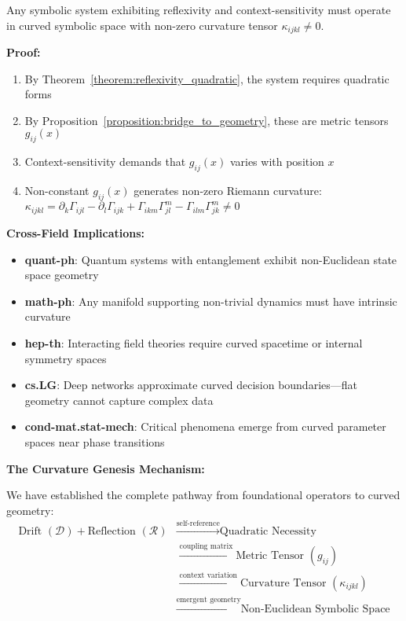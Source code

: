 \begin{corollary}
\label{corollary:non_euclidean_necessity}
Any symbolic system exhibiting reflexivity and context-sensitivity must operate in curved symbolic space with non-zero curvature tensor $\kappa_{ijkl} \neq 0$.

\textbf{Proof:} 
\begin{enumerate}
\item By Theorem~\ref{theorem:reflexivity_quadratic}, the system requires quadratic forms
\item By Proposition~\ref{proposition:bridge_to_geometry}, these are metric tensors $g_{ij}(x)$
\item Context-sensitivity demands that $g_{ij}(x)$ varies with position $x$
\item Non-constant $g_{ij}(x)$ generates non-zero Riemann curvature: $\kappa_{ijkl} = \partial_k \Gamma_{ijl} - \partial_l \Gamma_{ijk} + \Gamma_{ikm} \Gamma_{jl}^m - \Gamma_{ilm} \Gamma_{jk}^m \neq 0$
\end{enumerate}

\textbf{Cross-Field Implications:}
\begin{itemize}
\item \textbf{quant-ph}: Quantum systems with entanglement exhibit non-Euclidean state space geometry
\item \textbf{math-ph}: Any manifold supporting non-trivial dynamics must have intrinsic curvature
\item \textbf{hep-th}: Interacting field theories require curved spacetime or internal symmetry spaces
\item \textbf{cs.LG}: Deep networks approximate curved decision boundaries—flat geometry cannot capture complex data
\item \textbf{cond-mat.stat-mech}: Critical phenomena emerge from curved parameter spaces near phase transitions
\end{itemize}
\end{corollary}

\textbf{The Curvature Genesis Mechanism:}

We have established the complete pathway from foundational operators to curved geometry:
\begin{align}
\text{Drift } (\mathcal{D}) + \text{Reflection } (\mathcal{R}) &\xrightarrow{\text{self-reference}} \text{Quadratic Necessity} \\
&\xrightarrow{\text{coupling matrix}} \text{Metric Tensor } (g_{ij}) \\
&\xrightarrow{\text{context variation}} \text{Curvature Tensor } (\kappa_{ijkl}) \\
&\xrightarrow{\text{emergent geometry}} \text{Non-Euclidean Symbolic Space}
\end{align}

